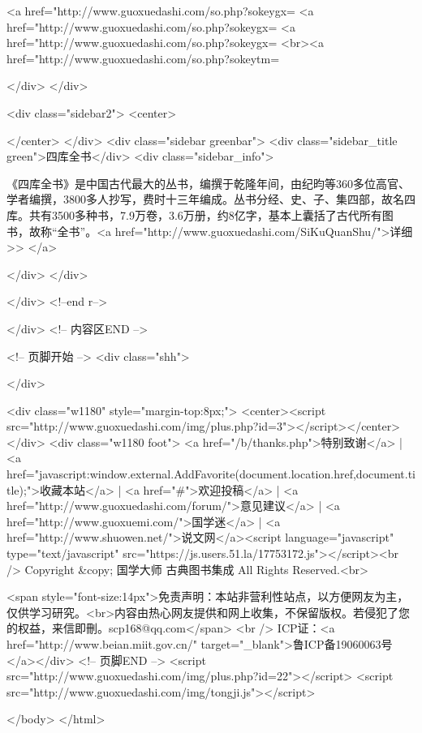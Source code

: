 <a href="http://www.guoxuedashi.com/so.php?sokeygx=%
<a href="http://www.guoxuedashi.com/so.php?sokeygx=%
<a href="http://www.guoxuedashi.com/so.php?sokeygx=%
<br><a href="http://www.guoxuedashi.com/so.php?sokeytm=%

</div>
</div>


<div class="sidebar2">
<center>

</center>
</div>
<div class="sidebar greenbar">
<div class="sidebar_title green">四库全书</div>
<div class="sidebar_info">

《四库全书》是中国古代最大的丛书，编撰于乾隆年间，由纪昀等360多位高官、学者编撰，3800多人抄写，费时十三年编成。丛书分经、史、子、集四部，故名四库。共有3500多种书，7.9万卷，3.6万册，约8亿字，基本上囊括了古代所有图书，故称“全书”。<a href="http://www.guoxuedashi.com/SiKuQuanShu/">详细>>
</a>

</div> 
</div>

</div>  <!--end r-->

</div>
<!-- 内容区END --> 

<!-- 页脚开始 -->
<div class="shh">

</div>

<div class="w1180" style="margin-top:8px;">
<center><script src="http://www.guoxuedashi.com/img/plus.php?id=3"></script></center>
</div>
<div class="w1180 foot">
<a href="/b/thanks.php">特别致谢</a> | <a href="javascript:window.external.AddFavorite(document.location.href,document.title);">收藏本站</a> | <a href="#">欢迎投稿</a> | <a href="http://www.guoxuedashi.com/forum/">意见建议</a> | <a href="http://www.guoxuemi.com/">国学迷</a> | <a href="http://www.shuowen.net/">说文网</a><script language="javascript" type="text/javascript" src="https://js.users.51.la/17753172.js"></script><br />
  Copyright &copy; 国学大师 古典图书集成 All Rights Reserved.<br>
  
  <span style="font-size:14px">免责声明：本站非营利性站点，以方便网友为主，仅供学习研究。<br>内容由热心网友提供和网上收集，不保留版权。若侵犯了您的权益，来信即刪。scp168@qq.com</span>
  <br />
ICP证：<a href="http://www.beian.miit.gov.cn/" target="_blank">鲁ICP备19060063号</a></div>
<!-- 页脚END --> 
<script src="http://www.guoxuedashi.com/img/plus.php?id=22"></script>
<script src="http://www.guoxuedashi.com/img/tongji.js"></script>

</body>
</html>
